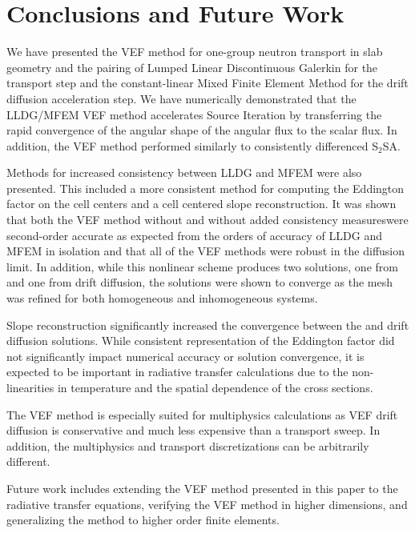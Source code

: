 
\section{Conclusions and Future Work}
We have presented the VEF method for one-group neutron transport in slab geometry and the pairing of Lumped Linear Discontinuous Galerkin for the \SN transport step and the constant-linear Mixed Finite Element Method for the drift diffusion acceleration step. We have numerically demonstrated that the LLDG/MFEM VEF method accelerates Source Iteration by transferring the rapid convergence of the angular shape of the angular flux to the scalar flux. In addition, the VEF method performed similarly to consistently differenced S$_2$SA. 

Methods for increased consistency between LLDG and MFEM were also presented. This included a more consistent method for computing the Eddington factor on the cell centers and a cell centered slope reconstruction. It was shown that both the VEF method without and without added consistency measureswere second-order accurate as expected from the orders of accuracy of LLDG and MFEM in isolation and that all of the VEF methods were robust in the diffusion limit. In addition, while this nonlinear scheme produces two solutions, one from \SN and one from drift diffusion, the solutions were shown to converge as the mesh was refined for both homogeneous and inhomogeneous systems. 

Slope reconstruction significantly increased the convergence between the \SN and drift diffusion solutions. While consistent representation of the Eddington factor did not significantly impact numerical accuracy or solution convergence, it is expected to be important in radiative transfer calculations due to the non-linearities in temperature and the spatial dependence of the cross sections. 

The VEF method is especially suited for multiphysics calculations as VEF drift diffusion is conservative and much less expensive than a transport sweep. In addition, the multiphysics and transport discretizations can be arbitrarily different. 


Future work includes extending the VEF method presented in this paper to the radiative transfer equations, verifying the VEF method in higher dimensions, and generalizing the method to higher order finite elements. 